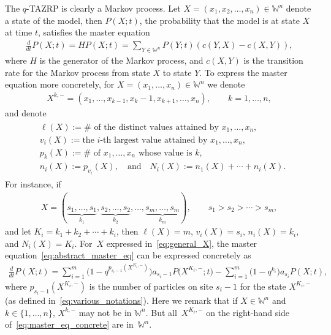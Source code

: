 \documentclass[pdftex]{sigma}
\numberwithin{equation}{section}
\newcommand{\Weylchamber}{\mathbb{W}}
\begin{document}
The $q$-TAZRP is clearly a Markov process. Let $X = (x_1, x_2, \dotsc, x_n) \in \Weylchamber^n$ denote a state of the model, then $P(X; t)$, the probability that the model is at state $X$ at time $t$, satisf\/ies the master equation
\begin{gather} \label{eq:abstract_master_eq}
 \frac{d}{dt} P(X; t) = H P(X; t) = \sum_{Y \in \Weylchamber^n} P(Y; t) (c(Y, X) - c(X, Y)),
\end{gather}
where $H$ is the generator of the Markov process, and $c(X, Y)$ is the transition rate for the Markov process from state $X$ to state $Y$. To express the master equation more concretely, for $X = (x_1, \dotsc, x_n) \in \Weylchamber^n$ we denote
\begin{gather*}
 X^{k, -} = (x_1, \dotsc, x_{k - 1}, x_k - 1, x_{k + 1}, \dotsc, x_n), \qquad k = 1, \dotsc, n,
\end{gather*}
and denote
\begin{gather} \label{eq:various_notations}
 \begin{split}
 & \ell(X) :=  \text{$\#$ of the distinct values attained by $x_1, \dotsc, x_n$}, \\
 & v_i(X) :=  \text{the $i$-th largest value attained by $x_1, \dotsc, x_n$}, \\
& p_k(X) :=  \text{$\#$ of $x_1, \dotsc, x_n$ whose value is $k$}, \\
 & n_i(X) :=  p_{v_i}(X), \quad \text{and} \quad N_i(X) := n_1(X) + \dotsb + n_i(X).
 \end{split}
\end{gather}
For instance, if
\begin{gather} \label{eq:general_X}
 X = (\underbrace{s_1, \dotsc, s_1}_{k_1}, \underbrace{s_2, \dotsc, s_2}_{k_2}, \dotsc, \underbrace{s_m, \dotsc, s_m}_{k_m}), \qquad s_1 > s_2 > \dotsb > s_m,
\end{gather}
and let $K_i = k_1 + k_2 + \dotsb + k_i$, then $\ell(X) = m$, $v_i(X) = s_i$, $n_i(X) = k_i$, and $N_i(X) = K_i$. For~$X$ expressed in~\eqref{eq:general_X}, the master equation~\eqref{eq:abstract_master_eq} can be expressed concretely as
\begin{gather} \label{eq:master_eq_concrete}
 \frac{d}{dt} P(X; t) = \sum^m_{i = 1} \big(1 - q^{p_{s_i - 1}(X^{K_i, -})}\big) a_{s_i - 1} P\big(X^{K_i, -}; t\big) - \sum^m_{i = 1} \big(1 - q^{k_i}\big) a_{s_i} P(X; t),
\end{gather}
where $p_{s_i - 1}(X^{K_i, -})$ is the number of particles on site $s_i - 1$ for the state $X^{K_i, -}$ (as def\/ined in~\eqref{eq:various_notations}). Here we remark that if $X \in \Weylchamber^n$ and $k \in \{ 1, \dotsc, n \}$, $X^{k, -}$ may not be in $\Weylchamber^n$. But all~$X^{K_i, -}$ on the right-hand side of~\eqref{eq:master_eq_concrete} are in~$\Weylchamber^n$.
\end{document}

